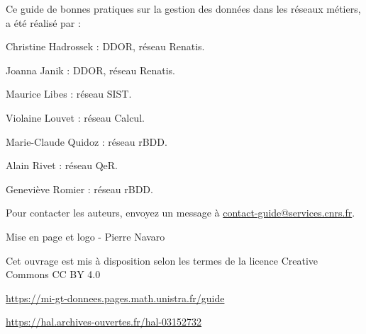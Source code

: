 \vspace*{\fill}
\begingroup

Ce guide de bonnes pratiques sur la gestion des données dans les réseaux métiers, a été réalisé par  :

\begin{list}{-}{}
\item Christine Hadrossek : DDOR, réseau Renatis.
\item Joanna Janik : DDOR, réseau Renatis.
\item Maurice Libes : réseau SIST.
\item Violaine Louvet : réseau Calcul.
\item Marie-Claude Quidoz : réseau rBDD.
\item Alain Rivet : réseau QeR.
\item Geneviève Romier : réseau rBDD.
\end{list}

Pour contacter les auteurs, envoyez un message à \href{mailto:contact-guide@services.cnrs.fr}{contact-guide@services.cnrs.fr}.

Mise en page et logo - Pierre Navaro

Cet ouvrage est mis à disposition selon les termes de la licence Creative Commons CC BY 4.0 \ccby

\url{https://mi-gt-donnees.pages.math.unistra.fr/guide}

\url{https://hal.archives-ouvertes.fr/hal-03152732}

\endgroup

\vspace*{\fill}
\clearpage
